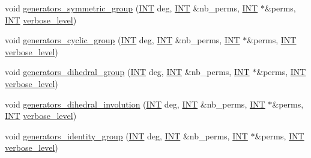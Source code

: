 \begin{DoxyCompactItemize}
\item 
void \mbox{\hyperlink{group__generators_8_c_a4ecf08598133e7c90158d33894f91460}{generators\+\_\+symmetric\+\_\+group}} (\mbox{\hyperlink{galois_8h_a09fddde158a3a20bd2dcadb609de11dc}{I\+NT}} deg, \mbox{\hyperlink{galois_8h_a09fddde158a3a20bd2dcadb609de11dc}{I\+NT}} \&nb\+\_\+perms, \mbox{\hyperlink{galois_8h_a09fddde158a3a20bd2dcadb609de11dc}{I\+NT}} $\ast$\&perms, \mbox{\hyperlink{galois_8h_a09fddde158a3a20bd2dcadb609de11dc}{I\+NT}} \mbox{\hyperlink{simeon_8_c_a818073fbcc2f439e7c56952f67386122}{verbose\+\_\+level}})
\item 
void \mbox{\hyperlink{group__generators_8_c_ae5fbb75d2a69e84babab04ffc5fd8f08}{generators\+\_\+cyclic\+\_\+group}} (\mbox{\hyperlink{galois_8h_a09fddde158a3a20bd2dcadb609de11dc}{I\+NT}} deg, \mbox{\hyperlink{galois_8h_a09fddde158a3a20bd2dcadb609de11dc}{I\+NT}} \&nb\+\_\+perms, \mbox{\hyperlink{galois_8h_a09fddde158a3a20bd2dcadb609de11dc}{I\+NT}} $\ast$\&perms, \mbox{\hyperlink{galois_8h_a09fddde158a3a20bd2dcadb609de11dc}{I\+NT}} \mbox{\hyperlink{simeon_8_c_a818073fbcc2f439e7c56952f67386122}{verbose\+\_\+level}})
\item 
void \mbox{\hyperlink{group__generators_8_c_a2507a40a2a90fb0635fc0c145b35cf8d}{generators\+\_\+dihedral\+\_\+group}} (\mbox{\hyperlink{galois_8h_a09fddde158a3a20bd2dcadb609de11dc}{I\+NT}} deg, \mbox{\hyperlink{galois_8h_a09fddde158a3a20bd2dcadb609de11dc}{I\+NT}} \&nb\+\_\+perms, \mbox{\hyperlink{galois_8h_a09fddde158a3a20bd2dcadb609de11dc}{I\+NT}} $\ast$\&perms, \mbox{\hyperlink{galois_8h_a09fddde158a3a20bd2dcadb609de11dc}{I\+NT}} \mbox{\hyperlink{simeon_8_c_a818073fbcc2f439e7c56952f67386122}{verbose\+\_\+level}})
\item 
void \mbox{\hyperlink{group__generators_8_c_a8d19e7bec1338c3891c7146bb2e07f96}{generators\+\_\+dihedral\+\_\+involution}} (\mbox{\hyperlink{galois_8h_a09fddde158a3a20bd2dcadb609de11dc}{I\+NT}} deg, \mbox{\hyperlink{galois_8h_a09fddde158a3a20bd2dcadb609de11dc}{I\+NT}} \&nb\+\_\+perms, \mbox{\hyperlink{galois_8h_a09fddde158a3a20bd2dcadb609de11dc}{I\+NT}} $\ast$\&perms, \mbox{\hyperlink{galois_8h_a09fddde158a3a20bd2dcadb609de11dc}{I\+NT}} \mbox{\hyperlink{simeon_8_c_a818073fbcc2f439e7c56952f67386122}{verbose\+\_\+level}})
\item 
void \mbox{\hyperlink{group__generators_8_c_ad146821a32bde7901a7c78a942843b6d}{generators\+\_\+identity\+\_\+group}} (\mbox{\hyperlink{galois_8h_a09fddde158a3a20bd2dcadb609de11dc}{I\+NT}} deg, \mbox{\hyperlink{galois_8h_a09fddde158a3a20bd2dcadb609de11dc}{I\+NT}} \&nb\+\_\+perms, \mbox{\hyperlink{galois_8h_a09fddde158a3a20bd2dcadb609de11dc}{I\+NT}} $\ast$\&perms, \mbox{\hyperlink{galois_8h_a09fddde158a3a20bd2dcadb609de11dc}{I\+NT}} \mbox{\hyperlink{simeon_8_c_a818073fbcc2f439e7c56952f67386122}{verbose\+\_\+level}})

\end{DoxyCompactItemize}
